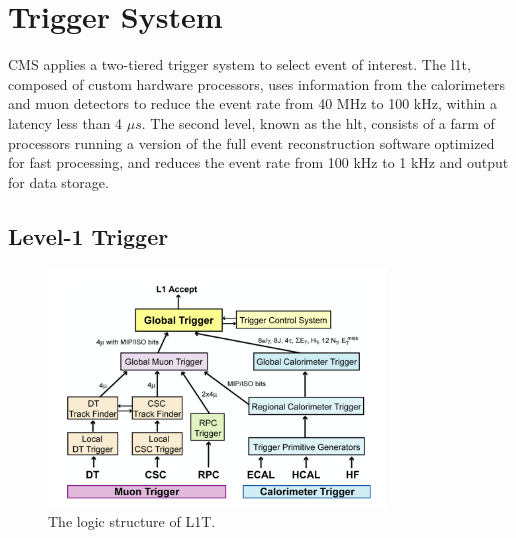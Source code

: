 \section{Trigger System}
\label{sec:cmsexperiment:trigger}

CMS applies a two-tiered trigger system \cite{cms:trigger:Khachatryan:2016bia} to select event of interest. The \acrfull{l1t}, composed of custom hardware processors, uses information from the calorimeters and muon detectors to reduce the event rate from 40 MHz to 100 kHz, within a latency less than 4 $\mu s$. The second level, known as the \acrfull{hlt}, consists of a farm of processors running a version of the full event reconstruction software optimized for fast processing, and reduces the event rate from 100 kHz to 1 kHz and output for data storage.



\subsection{Level-1 Trigger}

\begin{figure}[ht]
    \centering
    \includegraphics[width=0.8\textwidth]{chapters/CMSExperiment/sectionTrigger/figures/trigger.png}
    \caption{The logic structure of L1T.}
    \label{fig:cmsexperiment:trigger:structure}
\end{figure}

